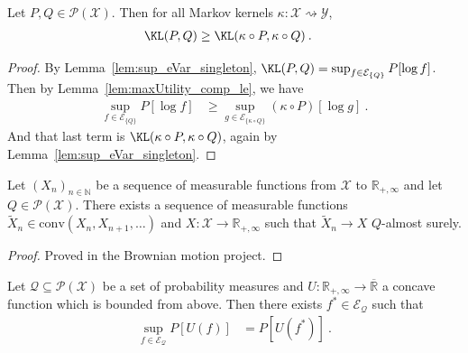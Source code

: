 \begin{theorem}\label{thm:dataprocessing_kl}
  Let $P, Q \in \mathcal{P}(\mathcal{X})$.
  Then for all Markov kernels $\kappa : \mathcal{X} \rightsquigarrow \mathcal{Y}$,
  \begin{align*}
    \KL(P, Q)
    &\ge \KL(\kappa \circ P, \kappa \circ Q)
    \: .
  \end{align*}
\end{theorem}

\begin{proof}
By Lemma~\ref{lem:sup_eVar_singleton}, $\KL(P, Q) = \sup_{f \in \mathcal{E}_{\{Q\}}} P[\log f]$.
Then by Lemma~\ref{lem:maxUtility_comp_le}, we have
\begin{align*}
  \sup_{f \in \mathcal{E}_{\{Q\}}} P[\log f]
  &\ge \sup_{g \in \mathcal{E}_{\{\kappa \circ Q\}}} (\kappa \circ P)[\log g]
  \: .
\end{align*}
And that last term is $\KL(\kappa \circ P, \kappa \circ Q)$, again by Lemma~\ref{lem:sup_eVar_singleton}.
\end{proof}



\begin{lemma}\label{lem:exists_mem_conv_tendsto}
Let $(X_n)_{n \in \mathbb{N}}$ be a sequence of measurable functions from $\mathcal{X}$ to $\mathbb{R}_{+,\infty}$ and let $Q \in \mathcal{P}(\mathcal{X})$.
There exists a sequence of measurable functions $\tilde{X}_n \in \mathrm{conv}(X_n, X_{n+1}, \ldots)$ and $X : \mathcal{X} \to \mathbb{R}_{+, \infty}$ such that $\tilde{X}_n \to X$ $Q$-almost surely.
\end{lemma}

\begin{proof}
Proved in the Brownian motion project.
\end{proof}


\begin{lemma}\label{lem:exists_integral_utility_eq_sup}
Let $\mathcal{Q} \subseteq \mathcal{P}(\mathcal{X})$ be a set of probability measures and $U : \mathbb{R}_{+,\infty} \to \overline{\mathbb{R}}$ a concave function which is bounded from above.
Then there exists $f^* \in \mathcal{E}_{\mathcal{Q}}$ such that
\begin{align*}
  \sup_{f \in \mathcal{E}_{\mathcal{Q}}} P[U(f)]
  &= P[U(f^*)]
  \: .
\end{align*}
\end{lemma}

